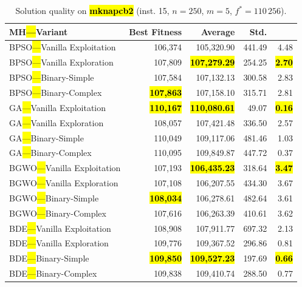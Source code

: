 \documentclass[mathematics,article,accept,moreauthors]{Definitions/mdpi}
\begin{document}
\begin{table}[H]
  \small
  \caption{Solution quality on \textbf{\hl{mknapcb2}} (inst. 15, $n=250$, $m=5$, $f^*=110\,256$).}
  \label{tab:calidad_mknapcb2_15}
  \begin{tabularx}{\textwidth}{lRRRR}
    \toprule
    \textbf{MH\hl{---}Variant} &
    \textbf{Best Fitness} &
    \textbf{Average} &
    \textbf{Std.} &
    \textbf{} \\
    \midrule
    BPSO\hl{---}Vanilla Exploitation &         106,374 &        105,320.90 & 441.49 &         4.48 \\
    BPSO\hl{---}Vanilla Exploration  &         107,809 & \textbf{\hl{107,279.29}} & 254.25 & \textbf{\hl{2.70}} \\
    BPSO\hl{---}Binary-Simple        &         107,584 &        107,132.13 & 300.58 &         2.83 \\
    BPSO\hl{---}Binary-Complex       & \textbf{\hl{107,863}} &        107,158.10 & 315.71 &         2.81 \\
    \midrule
    GA\hl{---}Vanilla Exploitation   & \textbf{\hl{110,167}} & \textbf{\hl{110,080.61}} &  49.07 & \textbf{\hl{0.16}} \\
    GA\hl{---}Vanilla Exploration    &         108,057 &        107,421.48 & 336.50 &         2.57 \\
    GA\hl{---}Binary-Simple          &         110,049 &        109,117.06 & 481.46 &         1.03 \\
    GA\hl{---}Binary-Complex         &         110,095 &        109,849.87 & 447.72 &         0.37 \\
    \midrule
    BGWO\hl{---}Vanilla Exploitation &         107,193 & \textbf{\hl{106,435.23}} & 318.64 & \textbf{\hl{3.47}} \\
    BGWO\hl{---}Vanilla Exploration  &         107,108 &        106,207.55 & 434.30 &         3.67 \\
    BGWO\hl{---}Binary-Simple        & \textbf{\hl{108,034}} &        106,278.61 & 482.64 &         3.61 \\
    BGWO\hl{---}Binary-Complex       &         107,616 &        106,263.39 & 410.61 &         3.62 \\
    \midrule
    BDE\hl{---}Vanilla Exploitation  &         108,908 &        107,911.77 & 697.32 &         2.13 \\
    BDE\hl{---}Vanilla Exploration   &         109,776 &        109,367.52 & 296.86 &         0.81 \\
    BDE\hl{---}Binary-Simple         & \textbf{\hl{109,850}} & \textbf{\hl{109,527.23}} & 197.69 & \textbf{\hl{0.66}} \\
    BDE\hl{---}Binary-Complex        &         109,838 &        109,410.74 & 288.50 &         0.77 \\
    \bottomrule
  \end{tabularx}
\end{table}
\end{document}

